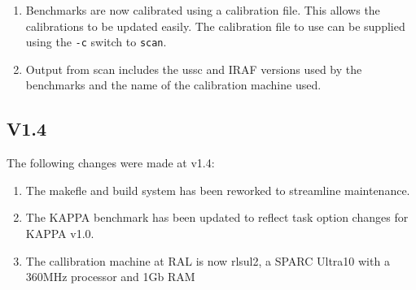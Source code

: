 \begin{enumerate}
\item Benchmarks are now calibrated using a calibration file. This
allows the calibrations to be updated easily. The calibration file to
use can be supplied using the {\tt -c} switch to {\tt scan}.
\item Output from scan includes the ussc and IRAF versions used by the
benchmarks and the name of the calibration machine used.
\end{enumerate}

\subsection{V1.4}

The following changes were made at v1.4:

\begin{enumerate}
\item The makefle and build system has been reworked to streamline maintenance.
\item The KAPPA benchmark has been updated to reflect task option changes for KAPPA v1.0.
\item The callibration machine at RAL is now rlsul2, a SPARC Ultra10 with a
360MHz processor and 1Gb RAM
\end{enumerate}


